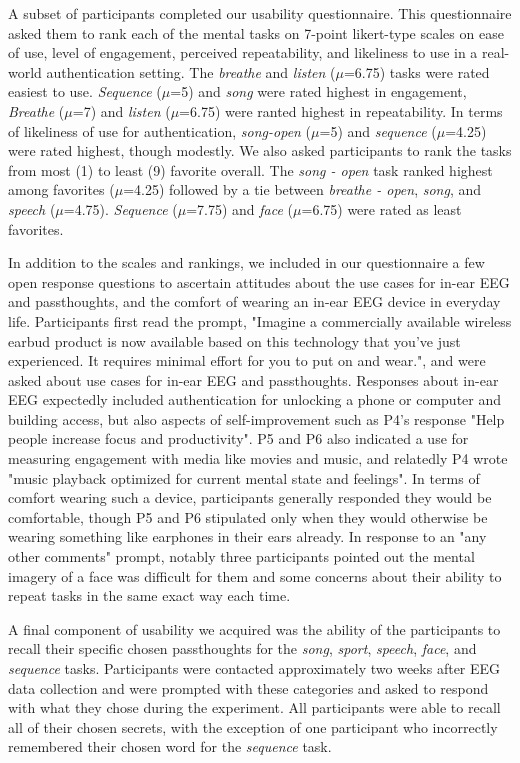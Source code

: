 \documentclass{sigchi}
\begin{document}
A subset of participants completed our usability questionnaire. This questionnaire asked them to rank each of the mental tasks on 7-point likert-type scales on ease of use, level of engagement, perceived repeatability, and likeliness to use in a real-world authentication setting. The \textit{breathe} and \textit{listen} (\(\mu\)=6.75) tasks were rated easiest to use. \textit{Sequence} (\(\mu\)=5) and \textit{song} were rated highest in engagement, \textit{Breathe} (\(\mu\)=7) and \textit{listen} (\(\mu\)=6.75) were ranted highest in repeatability. In terms of likeliness of use for authentication, \textit{song-open} (\(\mu\)=5) and \textit{sequence} (\(\mu\)=4.25) were rated highest, though modestly. We also asked participants to rank the tasks from most (1) to least (9) favorite overall. The \textit{song - open} task ranked highest among favorites (\(\mu\)=4.25) followed by a tie between \textit{breathe - open}, \textit{song}, and \textit{speech} (\(\mu\)=4.75). \textit{Sequence} (\(\mu\)=7.75) and \textit{face} (\(\mu\)=6.75) were rated as least favorites.

In addition to the scales and rankings, we included in our questionnaire a few open response questions to ascertain attitudes about the use cases for in-ear EEG and passthoughts, and the comfort of wearing an in-ear EEG device in everyday life. Participants first read the prompt, "Imagine a commercially available wireless earbud product is now available based on this technology that you've just experienced. It requires minimal effort for you to put on and wear.", and were asked about use cases for in-ear EEG and passthoughts. Responses about in-ear EEG expectedly included authentication for unlocking a phone or computer and building access, but also aspects of self-improvement such as P4's response "Help people increase focus and productivity". P5 and P6 also indicated a use for measuring engagement with media like movies and music, and relatedly P4 wrote "music playback optimized for current mental state and feelings". In terms of comfort wearing such a device, participants generally responded they would be comfortable, though P5 and P6 stipulated only when they would otherwise be wearing something like earphones in their ears already. In response to an "any other comments" prompt, notably three participants pointed out the mental imagery of a face was difficult for them and some concerns about their ability to repeat tasks in the same exact way each time.

A final component of usability we acquired was the ability of the participants to recall their specific chosen passthoughts for the \textit{song}, \textit{sport}, \textit{speech}, \textit{face}, and \textit{sequence} tasks. Participants were contacted approximately two weeks after EEG data collection and were prompted with these categories and asked to respond with what they chose during the experiment. All participants were able to recall all of their chosen secrets, with the exception of one participant who incorrectly remembered their chosen word for the \textit{sequence} task. 
\end{document}
